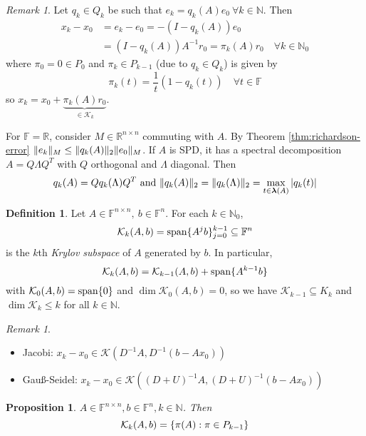 \documentclass[12pt]{article}
\newcounter{lecture}
\newtheorem{proposition}[theorem]{Proposition}
\theoremstyle{definition}
\newtheorem{definition}[theorem]{Definition}
\theoremstyle{remark}
\newtheorem{remark}[theorem]{Remark}
\newtheorem*{remark*}{Remark}
\numberwithin{equation}{section}
\newcommand{\F}{\mathbb{F}}
\newcommand{\R}{\mathbb{R}}
\newcommand{\N}{\mathbb{N}}
\newcommand{\K}{\mathcal{K}}
\newcommand{\spectrum}[1]{\bm{\lambda}(#1)}
\DeclarePairedDelimiter{\norm}{\lVert}{\rVert}
\DeclarePairedDelimiter{\set}{\{}{\}}
\DeclareMathOperator{\mathspan}{span}
\begin{document}
\begin{remark}
  Let $q_k \in Q_k$ be such that $e_k = q_k(A)e_0\ \forall k \in \N$. Then
  \begin{align*}
    x_k - x_0 &= e_k - e_0 = -(I-q_k(A))e_0 \\
    &= (I-q_k(A))A^{-1} r_0 = \pi_k(A) r_0 \quad \forall k \in \N_0
  \end{align*}
  where $\pi_0 = 0 \in P_0$ and $\pi_k \in P_{k-1}$ (due to $q_k \in Q_k$) is given by
  \begin{equation*}
    \pi_k(t) = \frac{1}{t} (1 - q_k(t)) \quad \forall t \in \F
  \end{equation*}
  so $x_k = x_0 + \underbrace{\pi_k(A) r_0}_{\in \K_k}$.

  For $\F = \R$, consider $M \in \R^{n\times n}$ commuting with $A$. By Theorem \ref{thm:richardson-error} $\norm{e_k}_M \leq \norm{q_k(A)}_2 \norm{e_0}_M$. If $A$ is SPD, it has a spectral decomposition $A = Q \Lambda Q^T$ with $Q$ orthogonal and $\Lambda$ diagonal. Then
  \begin{equation*}
    q_k(A) = Q q_k(\Lambda) Q^T \text{ and }\norm{q_k(A)}_2 = \norm{q_k(\Lambda)}_2 = \max_{t \in \spectrum{A}} |q_k(t)|
  \end{equation*}
\end{remark}
\begin{definition}
  Let $A \in \F^{n\times n},\ b \in \F^n$. For each $k \in \N_0$,
  \begin{equation*}
    \K_k(A,b) = \mathspan\set{A^j b}_{j=0}^{k-1} \subseteq \F^n
  \end{equation*}
  is the $k$th \emph{Krylov subspace} of $A$ generated by $b$.  In particular,
  \begin{equation*}
    \K_k(A,b) = \K_{k-1} (A,b) + \mathspan\set{A^{k-1} b}
  \end{equation*}
  with $\K_0(A,b) = \mathspan\set{0}$ and $\dim \K_0(A,b) = 0$, so we have $\K_{k-1} \subseteq K_k$ and $\dim \K_k \leq k$ for all $k \in \N$.
\end{definition}
\begin{remark*}
  \begin{itemize}
    \item Jacobi: $x_k - x_0 \in \K(D^{-1}A, D^{-1}(b-Ax_0))$
    \item Gauß-Seidel: $x_k - x_0 \in \K((D+U)^{-1}A, (D+U)^{-1}(b-Ax_0))$
  \end{itemize}
\end{remark*}
\begin{proposition}
  \label{prop:7.2}
  $A \in \F^{n\times n}, b \in \F^n, k \in \N$. Then
  \begin{equation*}
    \K_k(A,b) = \set{\pi(A): \pi \in P_{k-1}}
  \end{equation*}
\end{proposition}
\end{document}

